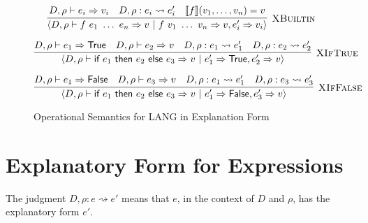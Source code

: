 \documentclass{article}
\def\xnf#1#2#3{D,#1 : #2 \rightsquigarrow #3}
\begin{document}
\begin{figure*}[h]
$$
\infer[\textsc{XBuiltin}]{
	\langle D, \rho \vdash f \ e_1 \ \dots \ e_n \Rightarrow v \ | \ f \ v_1 \ \dots \ v_n \Rightarrow v, e_i' \Rightarrow v_i \rangle
}{
	D, \rho \vdash e_i \Rightarrow v_i
	&
	D, \rho : e_i \rightsquigarrow e_i'
	&
	\llbracket f\rrbracket(v_1, \dots, v_n) = v
}
$$

$$
\infer[\textsc{XIfTrue}]{
	\langle D, \rho \vdash \textsf{if } e_1 \ \textsf{then } e_2 \ \textsf{else } e_3 \Rightarrow v \ | \ e_1' \Rightarrow \textsf{True}, e_2' \Rightarrow v \rangle
}{
	D, \rho \vdash e_1 \Rightarrow \textsf{True}
	&
	D, \rho \vdash e_2 \Rightarrow v
	&
	D, \rho : e_1 \rightsquigarrow e_1'
	&
	D, \rho : e_2 \rightsquigarrow e_2'
}
$$

$$
\infer[\textsc{XIfFalse}]{
	\langle D, \rho \vdash \textsf{if } e_1 \ \textsf{then } e_2 \ \textsf{else } e_3 \Rightarrow v \ | \ e_1' \Rightarrow \textsf{False}, e_3' \Rightarrow v \rangle
}{
	D, \rho \vdash e_1 \Rightarrow \textsf{False}
	&
	D, \rho \vdash e_3 \Rightarrow v
	&
	D, \rho : e_1 \rightsquigarrow e_1'
	&
	D, \rho : e_3 \rightsquigarrow e_3'
}
$$
\caption{Operational Semantics for LANG in Explanation Form}
\end{figure*}

\pagebreak

\section*{Explanatory Form for Expressions}

The judgment $\xnf \rho e e'$ means that $e$, in the context of $D$ and $\rho$, has the explanatory form $e'$.
\end{document}
